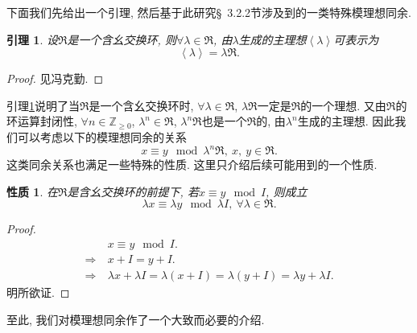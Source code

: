 \documentclass[UTF8, twoside]{ctexart}
\theoremstyle{nonumberplain}
\newtheorem{proof}{\heiti 证明}  %
\theoremstyle{nonumberplain}
\theoremstyle{plain}
\newtheorem{yinli4}[dingyi4]{引理}
\newtheorem{xingzhi4}[dingyi4]{性质}
\begin{document}
	下面我们先给出一个引理, 然后基于此研究\S~3.2.2节涉及到的一类特殊模理想同余.
	\begin{yinli4} \label{202102250946}
		设$\Re$是一个含幺交换环, 则$\forall \lambda \in \Re $, 由$\lambda $生成的主理想$\left\langle \lambda  \right\rangle $可表示为
		\[
		\left\langle \lambda  \right\rangle =\lambda \Re .
		\]
	\end{yinli4}
	\begin{proof}
		见冯克勤\cite[P66]{fengkeqin}.
	\end{proof}
	\vskip 0.5cm
	
	引理\ref{202102250946}说明了当$\Re $是一个含幺交换环时, $\forall \lambda \in \Re $, $\lambda \Re $一定是$\Re $的一个理想. 又由$\Re $的环运算封闭性, $\forall n\in {{\mathbb{Z}}_{\ge 0}}$, ${{\lambda }^{n}}\in \Re $, ${{\lambda }^{n}}\Re $也是一个$\Re $的, 由${{\lambda }^{n}}$生成的主理想. 因此我们可以考虑以下的模理想同余的关系
	\[
	x\equiv y\ \bmod {{\lambda }^{n}}\Re ,
	\ x,\ y\in \Re .
	\]
	这类同余关系也满足一些特殊的性质. 这里只介绍后续可能用到的一个性质.
	\begin{xingzhi4}
		在$\Re$是含幺交换环的前提下, 若$x\equiv y
		\ \bmod I$, 则成立
		\[
			\lambda x\equiv \lambda y\ \bmod \lambda I,\ \forall \lambda \in \Re .
		\]
	\end{xingzhi4}
	\begin{proof}
		\begin{align*}
			& x\equiv y\ \bmod I. \\ 
			\Longrightarrow\ & x+I=y+I. \\ 
			\Longrightarrow\ & \lambda x+\lambda I=\lambda \left( x+I \right)=\lambda \left( y+I \right)=\lambda y+\lambda I.
		\end{align*}
		明所欲证.
	\end{proof}
	\vskip 0.5cm
	
	至此, 我们对模理想同余作了一个大致而必要的介绍.
	
	\newpage
\end{document}
